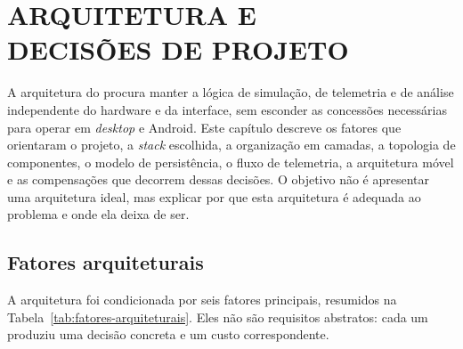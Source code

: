 
\chapter[ARQUITETURA E DECISÕES DE PROJETO]{ARQUITETURA E\\DECISÕES DE PROJETO}
\label{cap:arquitetura}

A arquitetura do \argus{} procura manter a lógica de simulação, de telemetria e
de análise independente do hardware e da interface, sem esconder as concessões
necessárias para operar em \textit{desktop} e Android. Este capítulo descreve os
fatores que orientaram o projeto, a \textit{stack} escolhida, a organização em
camadas, a topologia de componentes, o modelo de persistência, o fluxo de
telemetria, a arquitetura móvel e as compensações que decorrem dessas decisões.
O objetivo não é apresentar uma arquitetura ideal, mas explicar por que esta
arquitetura é adequada ao problema e onde ela deixa de ser.

\section{Fatores arquiteturais}
\label{sec:fatores-arquiteturais}

A arquitetura foi condicionada por seis fatores principais, resumidos na
Tabela~\ref{tab:fatores-arquiteturais}. Eles não são requisitos abstratos: cada
um produziu uma decisão concreta e um custo correspondente.

